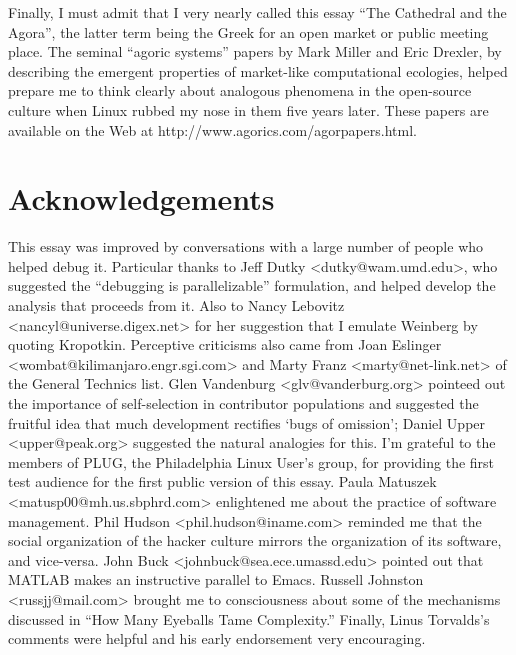 \documentclass[a4paper,12pt,UTF8,twoside]{ctexbook}
\begin{document}
Finally, I must admit that I very nearly called this essay ``The Cathedral and the Agora'', the latter term being the Greek for an open market or public meeting place. The seminal ``agoric systems'' papers by Mark Miller and Eric Drexler, by describing the emergent properties of market-like computational ecologies, helped prepare me to think clearly about analogous phenomena in the open-source culture when Linux rubbed my nose in them five years later. These papers are available on the Web at http://www.agorics.com/agorpapers.html.

\chapter{Acknowledgements}

This essay was improved by conversations with a large number of people who helped debug it. Particular thanks to Jeff Dutky <dutky@wam.umd.edu>, who suggested the ``debugging is parallelizable'' formulation, and helped develop the analysis that proceeds from it. Also to Nancy Lebovitz <nancyl@universe.digex.net> for her suggestion that I emulate Weinberg by quoting Kropotkin. Perceptive criticisms also came from Joan Eslinger <wombat@kilimanjaro.engr.sgi.com> and Marty Franz <marty@net-link.net> of the General Technics list. Glen Vandenburg <glv@vanderburg.org> pointeed out the importance of self-selection in contributor populations and suggested the fruitful idea that much development rectifies `bugs of omission'; Daniel Upper <upper@peak.org> suggested the natural analogies for this. I'm grateful to the members of PLUG, the Philadelphia Linux User's group, for providing the first test audience for the first public version of this essay. Paula Matuszek <matusp00@mh.us.sbphrd.com> enlightened me about the practice of software management. Phil Hudson <phil.hudson@iname.com> reminded me that the social organization of the hacker culture mirrors the organization of its software, and vice-versa. John Buck <johnbuck@sea.ece.umassd.edu> pointed out that MATLAB makes an instructive parallel to Emacs. Russell Johnston <russjj@mail.com> brought me to consciousness about some of the mechanisms discussed in ``How Many Eyeballs Tame Complexity.'' Finally, Linus Torvalds's comments were helpful and his early endorsement very encouraging.
\end{document}
